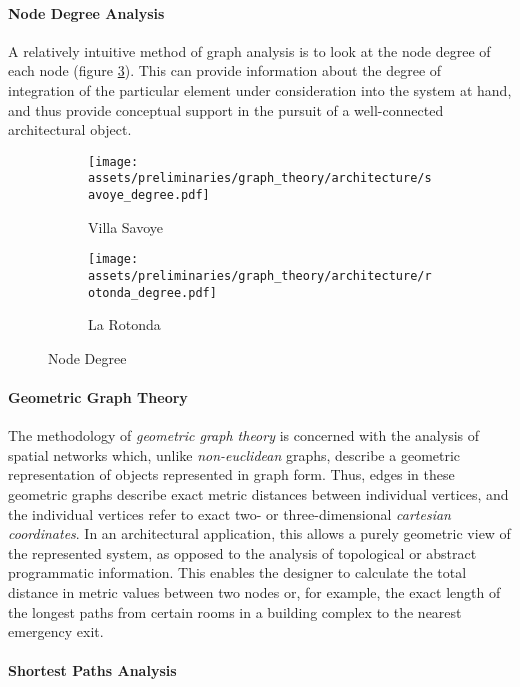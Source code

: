 \documentclass[a4paper, 12pt]{report}
\begin{document}
\paragraph{Node Degree Analysis}\label{par:node-degree-analysis}

A relatively intuitive method of graph analysis is to look at the \gls{node degree} of each node (figure \ref{fig:node-degree}). This can provide information about the degree of integration of the particular element under consideration into the system at hand, and thus provide conceptual support in the pursuit of a well-connected architectural object.

\begin{figure}
\centering
\begin{subfigure}{.5\textwidth}
\centering
\texttt{[image: assets/preliminaries/graph\_theory/architecture/savoye\_degree.pdf]}
\caption{Villa Savoye}
\label{fig:villa-savoye-3}
\end{subfigure}%
\begin{subfigure}{.5\textwidth}
\centering
\texttt{[image: assets/preliminaries/graph\_theory/architecture/rotonda\_degree.pdf]}
\caption{La Rotonda}
\label{fig:la-rotonda-3}
\end{subfigure}
\caption{Node Degree}
\label{fig:node-degree}
\end{figure}

\paragraph{Geometric Graph Theory}\label{par:geometric-graph-theory}

The methodology of \textit{geometric graph theory} is concerned with the analysis of spatial networks which, unlike \textit{\gls{non-euclidean}} graphs, describe a geometric representation of objects represented in graph form. Thus, edges in these geometric graphs describe exact metric distances between individual vertices, and the individual vertices refer to exact two- or three-dimensional \textit{\gls{cartesian coordinates}}. In an architectural application, this allows a purely geometric view of the represented system, as opposed to the analysis of topological or abstract programmatic information. This enables the designer to calculate the total distance in metric values between two nodes or, for example, the exact length of the longest paths from certain rooms in a building complex to the nearest emergency exit.

\paragraph{Shortest Paths Analysis}\label{par:shortest-paths-analysis}
\end{document}

